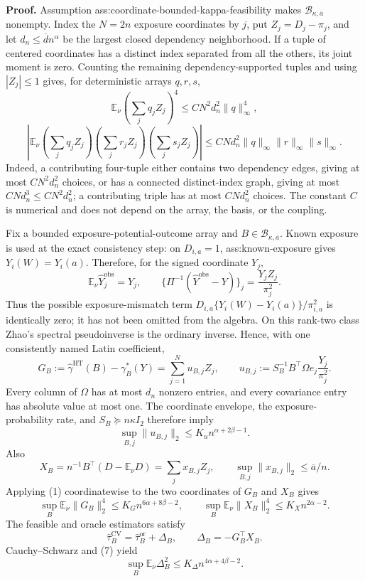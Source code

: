 \textbf{Proof.}
Assumption ass:coordinate-bounded-kappa-feasibility makes \(\mathcal B_{\kappa,\overline a}\) nonempty.  Index the \(N=2n\) exposure coordinates by \(j\), put \(Z_j=D_j-\pi_j\), and let \(d_n\le\overline d n^\alpha\) be the largest closed dependency neighborhood.  If a tuple of centered coordinates has a distinct index separated from all the others, its joint moment is zero.  Counting the remaining dependency-supported tuples and using \(|Z_j|\le1\) gives, for deterministic arrays \(q,r,s\),
\[
\mathbb E_\nu\left(\sum_jq_jZ_j\right)^4
\le C N^2d_n^2\lVert q\rVert_\infty^4,
\tag{1}
\]
\[
\left|\mathbb E_\nu
\left(\sum_jq_jZ_j\right)
\left(\sum_jr_jZ_j\right)
\left(\sum_js_jZ_j\right)\right|
\le C Nd_n^2\lVert q\rVert_\infty\lVert r\rVert_\infty\lVert s\rVert_\infty.
\tag{2}
\]
Indeed, a contributing four-tuple either contains two dependency edges, giving at most \(CN^2d_n^2\) choices, or has a connected distinct-index graph, giving at most \(CNd_n^3\le CN^2d_n^2\); a contributing triple has at most \(CNd_n^2\) choices.  The constant \(C\) is numerical and does not depend on the array, the basis, or the coupling.

Fix a bounded exposure-potential-outcome array and \(B\in\mathcal B_{\kappa,\overline a}\).  Known exposure is used at the exact consistency step: on \(D_{i,a}=1\), ass:known-exposure gives \(Y_i(W)=Y_i(a)\).  Therefore, for the signed coordinate \(Y_j\),
\[
\mathbb E_\nu\widehat Y_j^{\mathrm{obs}}=Y_j,
\qquad
\{\Pi^{-1}(\widehat Y^{\mathrm{obs}}-Y)\}_j
=\frac{Y_jZ_j}{\pi_j^2}.
\tag{3}
\]
Thus the possible exposure-mismatch term \(D_{i,a}\{Y_i(W)-Y_i(a)\}/\pi_{i,a}^2\) is identically zero; it has not been omitted from the algebra.  On this rank-two class Zhao's spectral pseudoinverse is the ordinary inverse.  Hence, with one consistently named Latin coefficient,
\[
G_B:=\widehat\gamma^{\mathrm{HT}}(B)-\gamma_B^*(Y)=\sum_{j=1}^{N}u_{B,j}Z_j,\qquad u_{B,j}:=S_B^{-1}B^\top\Omega e_j\frac{Y_j}{\pi_j^2}.
\tag{4}
\]
Every column of \(\Omega\) has at most \(d_n\) nonzero entries, and every covariance entry has absolute value at most one.  The coordinate envelope, the exposure-probability rate, and \(S_B\succeq n\kappa I_2\) therefore imply
\[
\sup_{B,j}\lVert u_{B,j}\rVert_2
\le K_u n^{\alpha+2\beta-1}.
\tag{5}
\]
Also
\[
X_B=n^{-1}B^\top(D-\mathbb E_\nu D)
=\sum_jx_{B,j}Z_j,
\qquad
\sup_{B,j}\lVert x_{B,j}\rVert_2\le\overline a/n.
\tag{6}
\]
Applying (1) coordinatewise to the two coordinates of \(G_B\) and \(X_B\) gives
\[
\sup_B\mathbb E_\nu\lVert G_B\rVert_2^4
\le K_Gn^{6\alpha+8\beta-2},
\qquad
\sup_B\mathbb E_\nu\lVert X_B\rVert_2^4
\le K_Xn^{2\alpha-2}.
\tag{7}
\]
The feasible and oracle estimators satisfy
\[
\widehat\tau_B^{\mathrm{CV}}=\widehat\tau_B^{\mathrm{or}}+\Delta_B,
\qquad
\Delta_B=-G_B^\top X_B.
\]
Cauchy--Schwarz and (7) yield
\[
\sup_B\mathbb E_\nu\Delta_B^2
\le K_\Delta n^{4\alpha+4\beta-2}.
\tag{8}
\]

